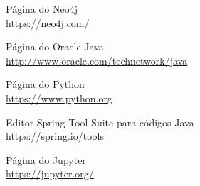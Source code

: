 \documentclass[a4paper,11pt]{article}
\begin{document}



\begin{thebibliography}{8}
  Página do Neo4j \\
  \url{https://neo4j.com/}

  Página do Oracle Java \\
  \url{http://www.oracle.com/technetwork/java}
  
  Página do Python \\
  \url{https://www.python.org}

  Editor Spring Tool Suite para códigos Java \\
  \url{https://spring.io/tools}

  Página do Jupyter \\
  \url{https://jupyter.org/}

  
\end{thebibliography}
  
\end{document}
